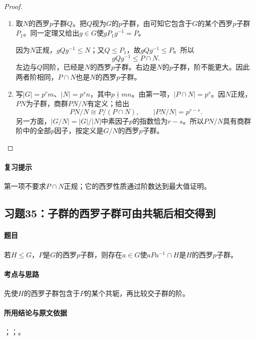 
\begin{proof}
\begin{enumerate}
\item 取$N$的西罗$p$子群$Q$。把$Q$视为$G$的$p$子群，由可知它包含于$G$的某个西罗$p$子群$P_1$。同一定理又给出$g\in G$使$gP_1g^{-1}=P$。

因为$N$正规，$gQg^{-1}\leq N$；又$Q\leq P_1$，故$gQg^{-1}\leq P$。所以
\[
gQg^{-1}\leq P\cap N.
\]
左边与$Q$同阶，已经是$N$的西罗$p$子群。右边是$N$的$p$子群，阶不能更大。因此两者阶相同，$P\cap N$也是$N$的西罗$p$子群。

\item 写$|G|=p^rm$、$|N|=p^sn$，其中$p\nmid mn$。由第一项，$|P\cap N|=p^s$。因$N$正规，$PN$为子群，商群$PN/N$有定义；给出
\[
PN/N\cong P/(P\cap N),\qquad |PN/N|=p^{r-s}.
\]
另一方面，$|G/N|=|G|/|N|$中素因子$p$的指数恰为$r-s$。所以$PN/N$具有商群阶中的全部$p$因子，按定义是$G/N$的西罗$p$子群。
\end{enumerate}
\end{proof}

\paragraph{复习提示}
第一项不要求$P\cap N$正规；它的西罗性质通过阶数达到最大值证明。


\subsection{习题35：\texorpdfstring{子群的西罗子群可由共轭后相交得到}{子群的西罗子群可由共轭后相交得到}}
\label{ex:2:35}

\paragraph{题目}
若$H\leq G$，$P$是$G$的西罗$p$子群，则存在$a\in G$使$aPa^{-1}\cap H$是$H$的西罗$p$子群。

\paragraph{考点与思路}
先使$H$的西罗子群包含于$P$的某个共轭，再比较交子群的阶。

\paragraph{所用结论与原文依据}
；；。

